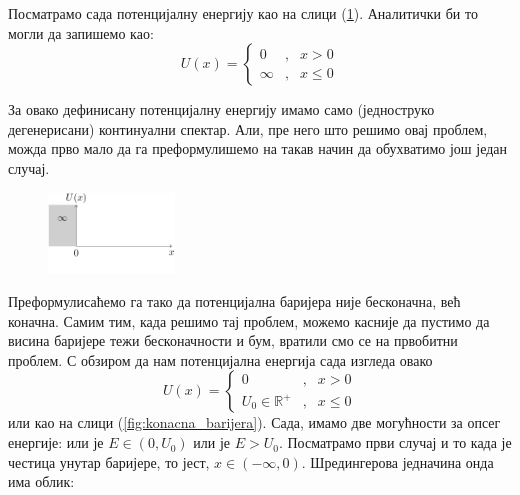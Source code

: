 \documentclass{tufte-handout} %
\theoremstyle{definition}
\theoremstyle{remark}
\newcommand{\R}{\mathbb{R}}
\begin{document}
Посматрамо сада потенцијалну енергију као на слици (\ref{fig:bolubeskonacni_domen}). Аналитички би то могли да запишемо као:
\begin{equation}
	U(x) = \left\{ \begin{array}{rcl}
	0 & \mbox{,}
	& x>0 \\ 
	\infty & \mbox{,} & x\leq0
\end{array}\right.
\end{equation}\par
За овако дефинисану потенцијалну енергију имамо само (једноструко дегенерисани) континуални спектар. Али, пре него што решимо овај проблем, можда прво мало да га преформулишемо на такав начин да обухватимо још један случај.
\begin{figure}
	\centering
	\includegraphics[width=0.3\textwidth]{polubeskonacni_domen.png}
	\caption{}
	\label{fig:bolubeskonacni_domen}
\end{figure}



Преформулисаћемо га тако да потенцијална баријера није бесконачна, већ коначна. Самим тим, када решимо тај проблем, можемо касније да пустимо да висина баријере тежи бесконачности и бум, вратили смо се на првобитни проблем. С обзиром да нам потенцијална енергија сада изгледа овако
\begin{equation}
	U(x) = \left\{ \begin{array}{rcl}
		0 & \mbox{,}
		& x>0 \\ 
		U_0\in\R^+ & \mbox{,} & x\leq0
	\end{array}\right.
\end{equation}
или као на слици (\ref{fig:konacna_barijera}). Сада, имамо две могућности за опсег енергије: или је $E\in(0, U_0)$ или је $E>U_0$. Посматрамо први случај и то када је честица унутар баријере, то јест, $x\in(-\infty, 0)$. Шредингерова једначина онда има облик:
\end{document}
